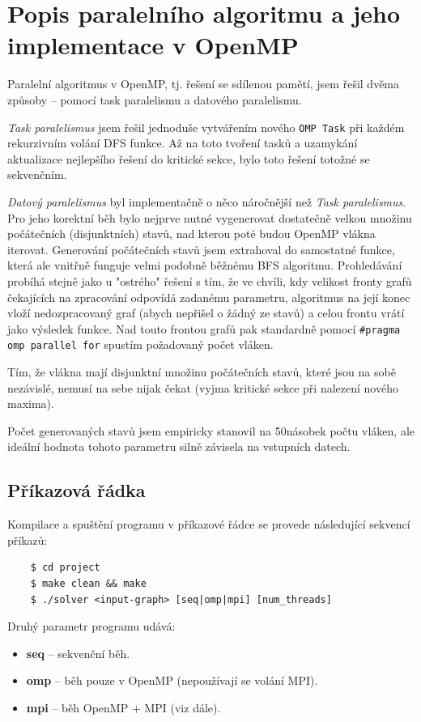 \documentclass[czech]{article}
\newcommand{\graphsperthread}{50}
\begin{document}
\section{Popis paralelního algoritmu a jeho implementace v OpenMP}

Paralelní algoritmus v OpenMP, tj. řešení se sdílenou pamětí, jsem řešil dvěma způsoby -- pomocí task paralelismu a datového paralelismu.

\textit{Task paralelismus} jsem řešil jednoduše vytvářením nového \texttt{OMP Task} při každém rekurzivním volání DFS funkce. Až na toto tvoření tasků a uzamykání aktualizace nejlepšího řešení do kritické sekce, bylo toto řešení totožné se sekvenčním.

\textit{Datový paralelismus} byl implementačně o něco náročnější než \textit{Task paralelismus}. Pro jeho korektní běh bylo nejprve nutné vygenerovat dostatečně velkou množinu počátečních (disjunktních) stavů, nad kterou poté budou OpenMP vlákna iterovat. Generování počátečních stavů jsem extrahoval do samostatné funkce, která ale vnitřně funguje velmi podobně běžnému BFS algoritmu. Prohledávání probíhá stejně jako u "ostrého" řešení s tím, že ve chvíli, kdy velikost fronty grafů čekajících na zpracování odpovídá zadanému parametru, algoritmus na její konec vloží nedozpracovaný graf (abych nepřišel o žádný ze stavů) a celou frontu vrátí jako výsledek funkce. Nad touto frontou grafů pak standardně pomocí \texttt{\#pragma omp parallel for} spustím požadovaný počet vláken.

Tím, že vlákna mají disjunktní množinu počátečních stavů, které jsou na sobě nezávislé, nemusí na sebe nijak čekat (vyjma kritické sekce při nalezení nového maxima).

Počet generovaných stavů jsem empiricky stanovil na \graphsperthread{}násobek počtu vláken, ale ideální hodnota tohoto parametru silně závisela na vstupních datech.

\subsection{Příkazová řádka}
Kompilace a spuštění programu v příkazové řádce se provede následující sekvencí příkazů:
\begin{verbatim}
	$ cd project
	$ make clean && make
	$ ./solver <input-graph> [seq|omp|mpi] [num_threads]
\end{verbatim}

\noindent Druhý parametr programu udává:
\begin{itemize}
	\item \textbf{seq} -- sekvenční běh.
	\item \textbf{omp} -- běh pouze v OpenMP (nepoužívají se volání MPI).
	\item \textbf{mpi} -- běh OpenMP + MPI (viz dále).
\end{itemize}
\end{document}
